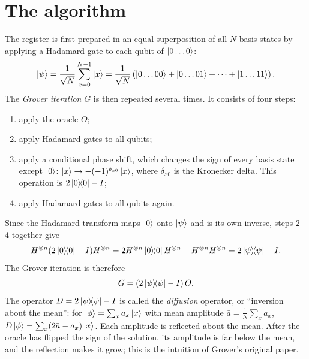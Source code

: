 \section{The algorithm}
The register is first prepared in an equal superposition of all $N$ basis states by applying a Hadamard gate to each qubit of $\left|0\dots0\right\rangle$:
\begin{equation}
  \left|\psi\right\rangle=\frac1{\sqrt N}\sum_{x=0}^{N-1}\left|x\right\rangle=\frac1{\sqrt N}\left(\left|0\dots00\right\rangle+\left|0\dots01\right\rangle+\dots+\left|1\dots11\right\rangle\right).
\end{equation}
The \emph{Grover iteration} $G$ is then repeated several times. It consists of four steps:
\begin{enumerate}
  \item apply the oracle $O$;
  \item apply Hadamard gates to all qubits;
  \item apply a conditional phase shift, which changes the sign of every basis state except $\left|0\right\rangle$: $\left|x\right\rangle\to-(-1)^{\delta_{x0}}\left|x\right\rangle$, where $\delta_{x0}$ is the Kronecker delta. This operation is $2\left|0\middle\rangle\!\middle\langle0\right|-I$;
  \item apply Hadamard gates to all qubits again.
\end{enumerate}
Since the Hadamard transform maps $\left|0\right\rangle$ onto $\left|\psi\right\rangle$ and is its own inverse, steps 2--4 together give
\begin{equation}
  H^{\otimes n}(2\left|0\middle\rangle\!\middle\langle0\right|-I)H^{\otimes n}=2H^{\otimes n}\left|0\middle\rangle\!\middle\langle0\right|H^{\otimes n}-H^{\otimes n}H^{\otimes n}=2\left|\psi\middle\rangle\!\middle\langle\psi\right|-I.
\end{equation}
The Grover iteration is therefore
\begin{equation}\label{eq:grover}
  G=\left(2\left|\psi\middle\rangle\!\middle\langle\psi\right|-I\right)O.
\end{equation}
The operator $D=2\left|\psi\middle\rangle\!\middle\langle\psi\right|-I$ is called the \emph{diffusion} operator, or ``inversion about the mean'': for $\left|\phi\right\rangle=\sum_xa_x\left|x\right\rangle$ with mean amplitude $\bar a=\frac1N\sum_xa_x$,
$D\left|\phi\right\rangle=\sum_x(2\bar a-a_x)\left|x\right\rangle$. Each amplitude is reflected about the mean. After the oracle has flipped the sign of the solution, its amplitude is far below the mean, and the reflection
makes it grow; this is the intuition of Grover's original paper.


